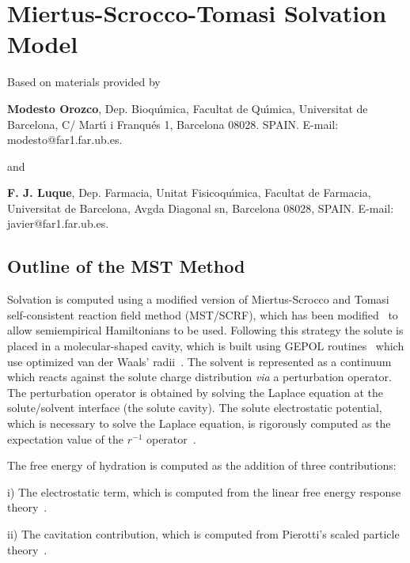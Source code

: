 \section{Miertus-Scrocco-Tomasi Solvation Model}
\label{mst}
\begin{center}Based on materials provided by\end{center}

{\bf Modesto Orozco}, Dep. Bioqu\'{\i}mica, Facultat de Qu\'{\i}mica,
Universitat de Barcelona, C/ Mart\'{\i} i Franqu\'{e}s 1, Barcelona 08028. 
SPAIN. E-mail: modesto@far1.far.ub.es.

and

{\bf F. J. Luque}, Dep. Farmacia, Unitat Fisicoqu\'{\i}mica, Facultat de Farmacia, 
Universitat de Barcelona, Avgda Diagonal sn,  Barcelona 08028, SPAIN. E-mail: javier@far1.far.ub.es.

\subsection{Outline of the MST Method}

Solvation is computed using a modified version of Miertus-Scrocco and 
Tomasi~\cite{mst,mt} self-consistent reaction field method (MST/SCRF), which 
has been modified~\cite{lno,glo,nol,lbo,obl} to allow semiempirical Hamiltonians 
to be used. Following this strategy the 
solute is placed in a molecular-shaped cavity, which is built using GEPOL 
routines~\cite{pastb} which use optimized van der Waals' radii~\cite{ojl,blo,rap}. 
The solvent is 
represented as a continuum which reacts against the solute charge distribution 
{\em via} a perturbation operator. The perturbation operator is obtained by 
solving the Laplace equation at the solute/solvent interface (the solute cavity). 
The solute electrostatic potential, which is necessary to solve the
Laplace equation, is rigorously computed as the expectation value of the 
$r^{-1}$ operator~\cite{mst,mt,lno,glo,nol,lbo,obl}.

The free energy of hydration is computed as the addition of three contributions: 

i) The electrostatic term, which is computed from the linear free energy response 
theory~\cite{mst,mt,lno,glo,nol,lbo,obl}.

ii) The cavitation contribution, which is computed from Pierotti's 
scaled particle theory~\cite{ojl,blo}.

